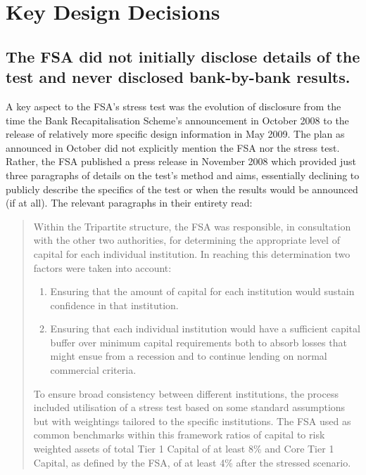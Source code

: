 \section{Key Design Decisions}\label{keydesign}

\subsection{The FSA did not initially disclose details of the test and never disclosed bank-by-bank results.}

A key aspect to the FSA's stress test was the evolution of disclosure from the time the Bank Recapitalisation Scheme's announcement in October 2008 to the release of relatively more specific design information in May 2009. The plan as announced in October did not explicitly mention the FSA nor the stress test. Rather, the FSA published a press release in November 2008 which provided just three paragraphs of details on the test's method and aims, essentially declining to publicly describe the specifics of the test or when the results would be announced (if at all). The relevant paragraphs in their entirety read:

\begin{quote}
  Within the Tripartite structure, the FSA was responsible, in consultation with the other two authorities, for determining the appropriate level of capital for each individual institution. In reaching this determination two factors were taken into account:

  \begin{enumerate}
    \item Ensuring that the amount of capital for each institution would sustain confidence in that institution.
    \item Ensuring that each individual institution would have a sufficient capital buffer over minimum capital requirements both to absorb losses that might ensue from a recession and to continue lending on normal commercial criteria.
  \end{enumerate}

  To ensure broad consistency between different institutions, the process included utilisation of a stress test based on some standard assumptions but with weightings tailored to the specific institutions. The FSA used as common benchmarks within this framework ratios of capital to risk weighted assets of total Tier 1 Capital of at least 8\% and Core Tier 1 Capital, as defined by the FSA, of at least 4\% after the stressed scenario.

\end{quote}

